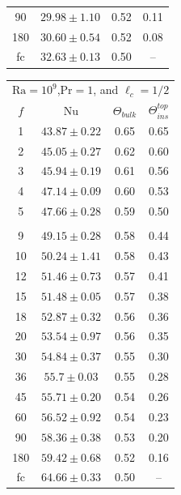 \documentclass{jfm}
\begin{document}
\begin{center}
\begin{tabular}{cccc}
    90 & $29.98\pm1.10$ & 0.52 & 0.11 \\
    180 & $30.60\pm0.54$ & 0.52 & 0.08 \\
    fc & $32.63\pm0.13$ & 0.50 & -- \\
\bottomrule
\end{tabular}%
\begin{tabular}{cccc}
\toprule
\multicolumn{4}{c}{$\text{Ra}=10^9$,$\text{Pr}=1$, and $\ell_c=1/2$} \\
	$f$ & $\text{Nu}$ & $\Theta_{bulk}$ & $\Theta^{top}_{ins}$ \\
\midrule
	1 & $43.87\pm0.22$ & 0.65 & 0.65 \\
	2 & $45.05\pm0.27$ & 0.62 & 0.60 \\
	3 & $45.94\pm0.19$ & 0.61 & 0.56 \\
	4 & $47.14\pm0.09$ & 0.60 & 0.53 \\
	5 & $47.66\pm0.28$ & 0.59 & 0.50 \\\\
	9 & $49.15\pm0.28$ & 0.58 & 0.44 \\
	10 & $50.24\pm1.41$ & 0.58 & 0.43 \\
	12 & $51.46\pm0.73$ & 0.57 & 0.41 \\
	15 & $51.48\pm0.05$ & 0.57 & 0.38 \\
	18 & $52.87\pm0.32$ & 0.56 & 0.36 \\
	20 & $53.54\pm0.97$ & 0.56 & 0.35 \\
	30 & $54.84\pm0.37$ & 0.55 & 0.30 \\
	36 & $55.7\pm0.03$ & 0.55 & 0.28 \\
	45 & $55.71\pm0.20$ & 0.54 & 0.26 \\
	60 & $56.52\pm0.92$ & 0.54 & 0.23 \\
	90 & $58.36\pm0.38$ & 0.53 & 0.20 \\
	180 & $59.42\pm0.68$ & 0.52 & 0.16 \\
	fc & $64.66\pm0.33$ & 0.50 & -- \\
\bottomrule
\end{tabular}%
\end{center}
\end{document}
